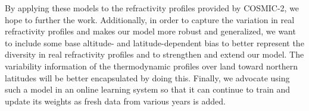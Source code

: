 \documentclass[a4paper,12pt,twoside]{article}
\begin{document}
\noindent By applying these models to the refractivity profiles provided by COSMIC-2, we hope to further
the work. Additionally, in order to capture the variation in real refractivity profiles and makes our
model more robust and generalized, we want to include some base altitude- and latitude-dependent
bias to better represent the diversity in real refractivity profiles and to strengthen and extend our
model. The variability information of the thermodynamic profiles over land toward northern
latitudes will be better encapsulated by doing this. Finally, we advocate using such a model in an
online learning system so that it can continue to train and update its weights as fresh data from
various years is added. \\



\newpage
{}
\printbibliography



\fancyhead{}
\newpage
\fancyhead{}
\newpage
{}
%
\end{document}
